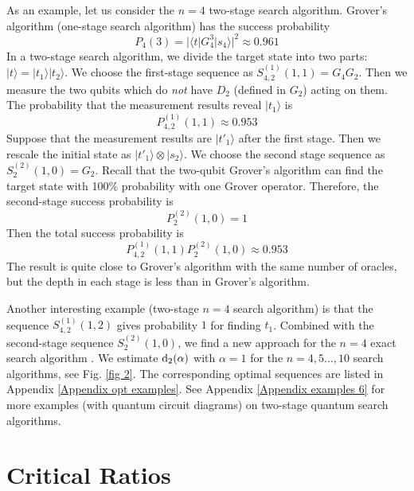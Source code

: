 \documentclass[%
 twocolumn,
 10pt,
 superscriptaddress,
 longbibliography,
 amsmath,amssymb,
 aps,
 pra,
floatfix,
]{revtex4-1}
\begin{document}
As an example, let us consider the $n=4$ two-stage search algorithm. Grover's algorithm (one-stage search algorithm) has the success probability 
\begin{equation}
    P_4(3)=|\langle t|G_4^3|s_4\rangle|^2\approx 0.961
\end{equation}
In a two-stage search algorithm, we divide the target state into two parts: $|t\rangle=|t_1\rangle|t_2\rangle$. We choose the first-stage sequence as $S^{(1)}_{4,2}(1,1)=G_4 G_2$. Then we measure the two qubits which do \textit{not} have $D_2$ (defined in $G_2$) acting on them. The probability that the measurement results reveal $|t_1\rangle$ is
\begin{equation}
    P^{(1)}_{4,2}(1,1)\approx 0.953
\end{equation}
Suppose that the measurement results are $|t'_1\rangle$ after the first stage. Then we rescale the initial state as $|t'_1\rangle\otimes|s_2\rangle$. We choose the second stage sequence as $S^{(2)}_{2}(1,0)=G_2$. Recall that the two-qubit Grover's algorithm can find the target state with 100\% probability with one Grover operator. Therefore, the second-stage success probability is
\begin{equation}
    P^{(2)}_{2}(1,0)=1
\end{equation}
Then the total success probability is
\begin{equation}
    P^{(1)}_{4,2}(1,1)P^{(2)}_{2}(1,0)\approx 0.953
\end{equation}
The result is quite close to Grover's algorithm with the same number of oracles, but the depth in each stage is less than in Grover's algorithm. 

Another interesting example (two-stage $n=4$ search algorithm) is that the sequence $S^{(1)}_{4,2}(1,2)$ gives probability $1$ for finding $t_1$. Combined with the second-stage sequence $S^{(2)}_{2}(1,0)$, we find a new approach for the $n=4$ exact search algorithm \cite{Diao10}. We estimate $\text d_2(\alpha)$ with $\alpha=1$ for the $n=4,5\ldots,10$ search algorithms, see Fig. \ref{fig 2}. The corresponding optimal sequences are listed in Appendix \ref{Appendix opt examples}. See Appendix \ref{Appendix examples 6} for more examples (with quantum circuit diagrams) on two-stage quantum search algorithms. 

\section{\label{sec:alpha}Critical Ratios}
\end{document}
